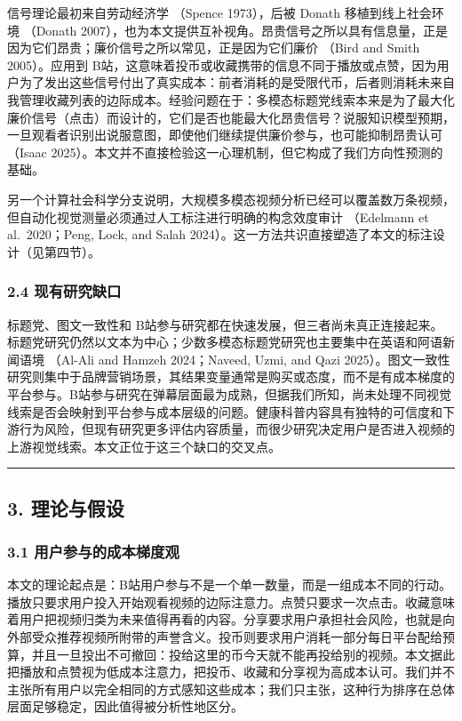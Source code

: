 \documentclass[
  fontset=none]{ctexart}
\begin{document}
信号理论最初来自劳动经济学 （Spence 1973），后被 Donath 移植到线上社会环境 （Donath 2007），也为本文提供互补视角。昂贵信号之所以具有信息量，正是因为它们昂贵；廉价信号之所以常见，正是因为它们廉价 （Bird and Smith 2005）。应用到 B站，这意味着投币或收藏携带的信息不同于播放或点赞，因为用户为了发出这些信号付出了真实成本：前者消耗的是受限代币，后者则消耗未来自我管理收藏列表的边际成本。经验问题在于：多模态标题党线索本来是为了最大化廉价信号（点击）而设计的，它们是否也能最大化昂贵信号？说服知识模型预期，一旦观看者识别出说服意图，即使他们继续提供廉价参与，也可能抑制昂贵认可 （Isaac 2025）。本文并不直接检验这一心理机制，但它构成了我们方向性预测的基础。

另一个计算社会科学分支说明，大规模多模态视频分析已经可以覆盖数万条视频，但自动化视觉测量必须通过人工标注进行明确的构念效度审计 （Edelmann et al.~2020；Peng, Lock, and Salah 2024）。这一方法共识直接塑造了本文的标注设计（见第四节）。

\subsubsection{2.4 现有研究缺口}\label{ux73b0ux6709ux7814ux7a76ux7f3aux53e3}

标题党、图文一致性和 B站参与研究都在快速发展，但三者尚未真正连接起来。标题党研究仍然以文本为中心；少数多模态标题党研究也主要集中在英语和阿语新闻语境 （Al-Ali and Hamzeh 2024；Naveed, Uzmi, and Qazi 2025）。图文一致性研究则集中于品牌营销场景，其结果变量通常是购买或态度，而不是有成本梯度的平台参与。B站参与研究在弹幕层面最为成熟，但据我们所知，尚未处理不同视觉线索是否会映射到平台参与成本层级的问题。健康科普内容具有独特的可信度和下游行为风险，但现有研究更多评估内容质量，而很少研究决定用户是否进入视频的上游视觉线索。本文正位于这三个缺口的交叉点。

\begin{center}\rule{0.5\linewidth}{0.5pt}\end{center}

\subsection{3. 理论与假设}\label{ux7406ux8bbaux4e0eux5047ux8bbe}

\subsubsection{3.1 用户参与的成本梯度观}\label{ux7528ux6237ux53c2ux4e0eux7684ux6210ux672cux68afux5ea6ux89c2}

本文的理论起点是：B站用户参与不是一个单一数量，而是一组成本不同的行动。播放只要求用户投入开始观看视频的边际注意力。点赞只要求一次点击。收藏意味着用户把视频归类为未来值得再看的内容。分享要求用户承担社会风险，也就是向外部受众推荐视频所附带的声誉含义。投币则要求用户消耗一部分每日平台配给预算，并且一旦投出不可撤回：投给这里的币今天就不能再投给别的视频。本文据此把播放和点赞视为低成本注意力，把投币、收藏和分享视为高成本认可。我们并不主张所有用户以完全相同的方式感知这些成本；我们只主张，这种行为排序在总体层面足够稳定，因此值得被分析性地区分。
\end{document}
